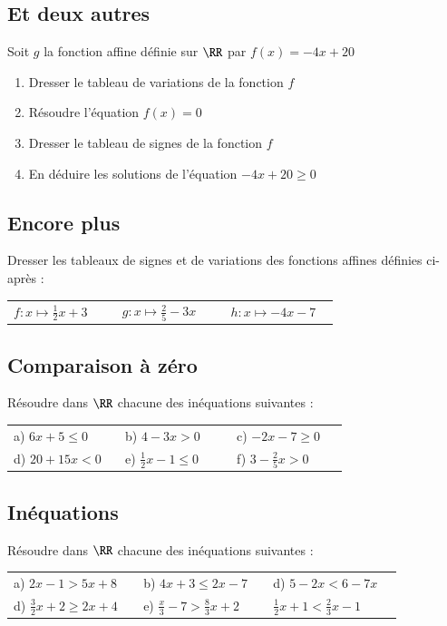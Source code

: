 \documentclass[oneside,12pt]{article}          %
\begin{document}
\subsection{Et deux autres}
Soit $g$ la fonction affine définie sur $\RR$ par $f(x)=-4x+20$
\begin{enumerate}
	\item Dresser le tableau de variations de la fonction $f$
	\item Résoudre l'équation $f(x)=0$
	\item Dresser le tableau de signes de la fonction $f$
	\item En déduire les solutions de l'équation $-4x+20\geq0$
\end{enumerate}



\subsection{Encore plus}
Dresser les tableaux de signes et de variations des fonctions affines définies ci-après :

\renewcommand{\arraystretch}{1.5}
\begin{tabular}{p{0.3\linewidth} p{0.3\linewidth} p{0.3\linewidth}}
	$f:x\mapsto\frac{1}{2}x+3$ & $g:x\mapsto\frac{2}{5}-3x$ & $h:x\mapsto-4x-7$
\end{tabular}



\subsection{Comparaison à zéro}
Résoudre dans $\RR$ chacune des inéquations suivantes :

\renewcommand{\arraystretch}{1.5}
\begin{tabular}{p{0.3\linewidth} p{0.3\linewidth} p{0.3\linewidth}}
	a) $6x+5\leq0$ & b) $4-3x>0$ & c) $-2x-7\geq0$ \\
	d) $20+15x<0$ & e) $\frac{1}{2}x-1\leq 0$ & f) $3-\frac{2}{5}x>0$
\end{tabular}



\subsection{Inéquations}
Résoudre dans $\RR$ chacune des inéquations suivantes :

\renewcommand{\arraystretch}{1.5}
\begin{tabular}{p{0.3\linewidth} p{0.3\linewidth} p{0.3\linewidth}}
	a) $2x-1>5x+8$ & b) $4x+3\leq2x-7$ & d) $5-2x<6-7x$ \\
	d) $\frac{3}{2}x+2\geq2x+4$ & e) $\frac{x}{3}-7>\frac{8}{3}x+2$ & $\frac{1}{2}x+1<\frac{2}{3}x-1$
\end{tabular}
\end{document}
